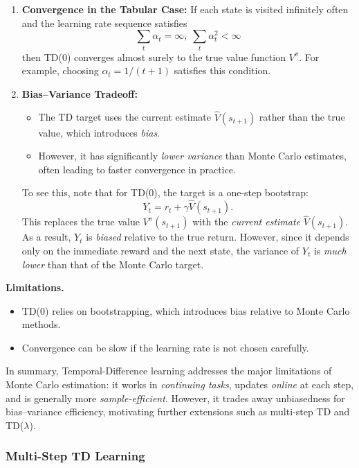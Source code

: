 \documentclass[
]{book}
\theoremstyle{definition}
\theoremstyle{definition}
\theoremstyle{definition}
\theoremstyle{definition}
\theoremstyle{remark}
\begin{document}
\begin{enumerate}
\def\labelenumi{\arabic{enumi}.}
\item
  \textbf{Convergence in the Tabular Case:} If each state is visited infinitely often and the learning rate sequence satisfies
  \[
  \sum_t \alpha_t = \infty, \; \sum_t \alpha_t^2 < \infty
  \]
  then TD(0) converges almost surely to the true value function \(V^\pi\). For example, choosing \(\alpha_t = 1/(t+1)\) satisfies this condition.
\item
  \textbf{Bias--Variance Tradeoff:}

  \begin{itemize}
  \item
    The TD target uses the current estimate \(\hat{V}(s_{t+1})\) rather than the true value, which introduces \emph{bias}.
  \item
    However, it has significantly \emph{lower variance} than Monte Carlo estimates, often leading to faster convergence in practice.
  \end{itemize}

  To see this, note that for TD(0), the target is a one-step bootstrap:
  \[
  Y_t = r_t + \gamma \hat{V}(s_{t+1}).
  \]
  This replaces the true value \(V^\pi(s_{t+1})\) with the \emph{current estimate} \(\hat{V}(s_{t+1})\). As a result, \(Y_t\) is \emph{biased} relative to the true return. However, since it depends only on the immediate reward and the next state, the variance of \(Y_t\) is \emph{much lower} than that of the Monte Carlo target.
\end{enumerate}

\textbf{Limitations.}

\begin{itemize}
\item
  TD(0) relies on bootstrapping, which introduces bias relative to Monte Carlo methods.
\item
  Convergence can be slow if the learning rate is not chosen carefully.
\end{itemize}

In summary, Temporal-Difference learning addresses the major limitations of Monte Carlo estimation: it works in \emph{continuing tasks}, updates \emph{online} at each step, and is generally more \emph{sample-efficient}. However, it trades away unbiasedness for bias--variance efficiency, motivating further extensions such as multi-step TD and TD(\(\lambda\)).

\subsubsection{Multi-Step TD Learning}\label{multi-step-td-learning}
\end{document}

